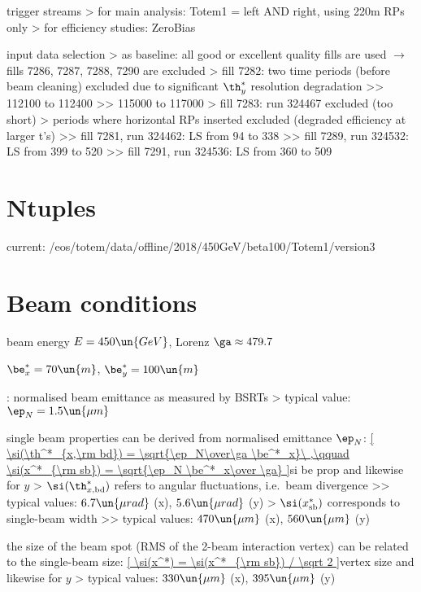 \> trigger streams
\>> for main analysis: Totem1 = left AND right, using 220m RPs only
\>> for efficiency studies: ZeroBias

\> input data selection
\>> as baseline: all good or excellent quality fills are used $\rightarrow$ fills 7286, 7287, 7288, 7290 are excluded
\>> fill 7282: two time periods (before beam cleaning) excluded due to significant $\th^*_y$ resolution degradation
\>>> 112100 to 112400
\>>> 115000 to 117000
\>> fill 7283: run 324467 excluded (too short)
\>> periods where horizontal RPs inserted excluded (degraded efficiency at larger t's)
\>>> fill 7281, run 324462: LS from 94 to 338
\>>> fill 7289, run 324532: LS from 399 to 520
\>>> fill 7291, run 324536: LS from 360 to 509



\chapter[ntuples]{Ntuples}

\> current: /eos/totem/data/offline/2018/450GeV/beta100/Totem1/version3



\chapter[beam-cond]{Beam conditions}

\> beam energy $E = 450\un{GeV}$, Lorenz $\ga \approx 479.7$

\> $\be^*_x = 70\un{m}$, $\be^*_y = 100\un{m}$

\> : normalised beam emittance as measured by BSRTs
\>> typical value: $\ep_N = 1.5\un{\mu m}$

\> single beam properties can be derived from normalised emittance $\ep_N$:
\eqref{
\si(\th^*_{x,\rm bd}) = \sqrt{\ep_N\over\ga \be^*_x}\ ,\qquad \si(x^*_{\rm sb}) = \sqrt{\ep_N \be^*_x\over \ga}
}{si be prop}
and likewise for $y$
\>> $\si(\th^*_{x,\rm bd})$ refers to angular fluctuations, i.e.~beam divergence
\>>> typical values: $6.7\un{\mu rad}$ (x), $5.6\un{\mu rad}$ (y)
\>> $\si(x^*_{\rm sb})$ corresponds to single-beam width
\>>> typical values: $470\un{\mu m}$ (x), $560\un{\mu m}$ (y)

\> the size of the beam spot (RMS of the 2-beam interaction vertex) can be related to the single-beam size:
\eqref{
\si(x^*) = \si(x^*_{\rm sb}) / \sqrt 2
}{vertex size}
and likewise for $y$
\>> typical values: $330\un{\mu m}$ (x), $395\un{\mu m}$ (y)

